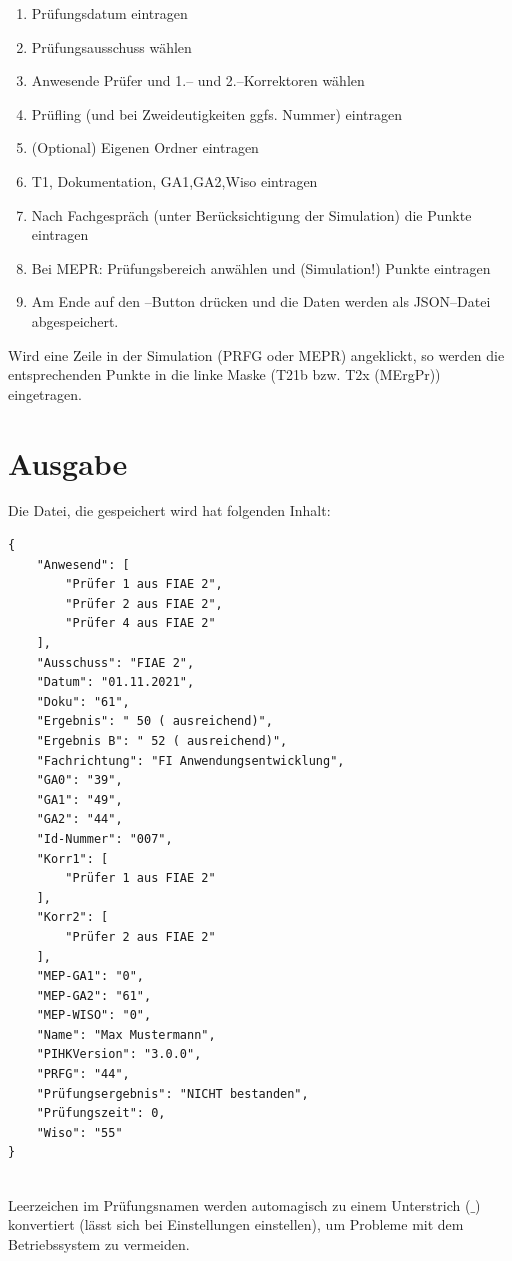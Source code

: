 \documentclass[a4paper,notitlepage,parskip=half]{scrartcl}
\newcommand{\cfile}[1]{{\texttt{#1}}}
\begin{document}
\begin{enumerate}
\item Prüfungsdatum eintragen
\item Prüfungsausschuss wählen
\item Anwesende Prüfer und 1.-- und 2.--Korrektoren wählen
\item Prüfling (und bei Zweideutigkeiten ggfs. Nummer) eintragen
\item (Optional) Eigenen Ordner eintragen
\item T1, Dokumentation, GA1,GA2,Wiso eintragen
\item Nach Fachgespräch (unter Berücksichtigung der Simulation) die Punkte eintragen
\item Bei MEPR: Prüfungsbereich anwählen und (Simulation!) Punkte eintragen
\item Am Ende auf den --Button drücken und die Daten werden als JSON--Datei abgespeichert.
\end{enumerate}

Wird eine Zeile in der Simulation (PRFG oder MEPR) angeklickt, so werden die entsprechenden Punkte in die linke
Maske (T21b bzw. T2x (MErgPr)) eingetragen.

\section{Ausgabe}
Die Datei, die gespeichert wird hat folgenden Inhalt:
\nopagebreak[4]

\begin{minipage}[t]{\textwidth}
\begin{lstlisting}[numbers=none,caption={\cfile{Gesicherte Datei: $20160621Max\_Mustermann13145678.txt$}},label=lst:datei]
{
    "Anwesend": [
        "Prüfer 1 aus FIAE 2",
        "Prüfer 2 aus FIAE 2",
        "Prüfer 4 aus FIAE 2"
    ],
    "Ausschuss": "FIAE 2",
    "Datum": "01.11.2021",
    "Doku": "61",
    "Ergebnis": " 50 ( ausreichend)",
    "Ergebnis B": " 52 ( ausreichend)",
    "Fachrichtung": "FI Anwendungsentwicklung",
    "GA0": "39",
    "GA1": "49",
    "GA2": "44",
    "Id-Nummer": "007",
    "Korr1": [
        "Prüfer 1 aus FIAE 2"
    ],
    "Korr2": [
        "Prüfer 2 aus FIAE 2"
    ],
    "MEP-GA1": "0",
    "MEP-GA2": "61",
    "MEP-WISO": "0",
    "Name": "Max Mustermann",
    "PIHKVersion": "3.0.0",
    "PRFG": "44",
    "Prüfungsergebnis": "NICHT bestanden",
    "Prüfungszeit": 0,
    "Wiso": "55"
}


\end{lstlisting}
\end{minipage}
Leerzeichen im Prüfungsnamen werden automagisch zu einem Unterstrich ($\_$) konvertiert (lässt sich bei Einstellungen einstellen), um Probleme mit dem Betriebssystem zu vermeiden.
\end{document}
